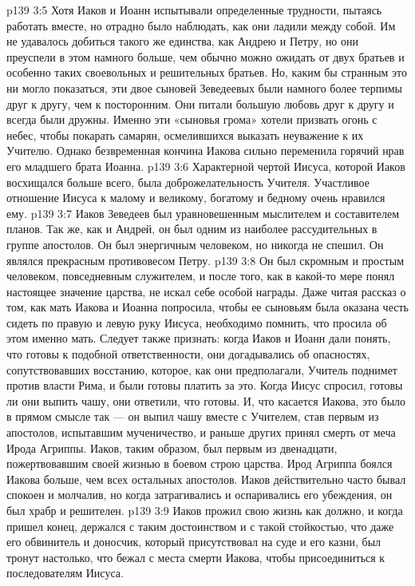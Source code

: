 \vs p139 3:5 Хотя Иаков и Иоанн испытывали определенные трудности, пытаясь работать вместе, но отрадно было наблюдать, как они ладили между собой. Им не удавалось добиться такого же единства, как Андрею и Петру, но они преуспели в этом намного больше, чем обычно можно ожидать от двух братьев и особенно таких своевольных и решительных братьев. Но, каким бы странным это ни могло показаться, эти двое сыновей Зеведеевых были намного более терпимы друг к другу, чем к посторонним. Они питали большую любовь друг к другу и всегда были дружны. Именно эти «сыновья грома» хотели призвать огонь с небес, чтобы покарать самарян, осмелившихся выказать неуважение к их Учителю. Однако безвременная кончина Иакова сильно переменила горячий нрав его младшего брата Иоанна.
\vs p139 3:6 \pc Характерной чертой Иисуса, которой Иаков восхищался больше всего, была доброжелательность Учителя. Участливое отношение Иисуса к малому и великому, богатому и бедному очень нравился ему.
\vs p139 3:7 \pc Иаков Зеведеев был уравновешенным мыслителем и составителем планов. Так же, как и Андрей, он был одним из наиболее рассудительных в группе апостолов. Он был энергичным человеком, но никогда не спешил. Он являлся прекрасным противовесом Петру.
\vs p139 3:8 Он был скромным и простым человеком, повседневным служителем, и после того, как в какой\hyp{}то мере понял настоящее значение царства, не искал себе особой награды. Даже читая рассказ о том, как мать Иакова и Иоанна попросила, чтобы ее сыновьям была оказана честь сидеть по правую и левую руку Иисуса, необходимо помнить, что просила об этом именно мать. Следует также признать: когда Иаков и Иоанн дали понять, что готовы к подобной ответственности, они догадывались об опасностях, сопутствовавших восстанию, которое, как они предполагали, Учитель поднимет против власти Рима, и были готовы платить за это. Когда Иисус спросил, готовы ли они выпить чашу, они ответили, что готовы. И, что касается Иакова, это было в прямом смысле так --- он выпил чашу вместе с Учителем, став первым из апостолов, испытавшим мученичество, и раньше других принял смерть от меча Ирода Агриппы. Иаков, таким образом, был первым из двенадцати, пожертвовавшим своей жизнью в боевом строю царства. Ирод Агриппа боялся Иакова больше, чем всех остальных апостолов. Иаков действительно часто бывал спокоен и молчалив, но когда затрагивались и оспаривались его убеждения, он был храбр и решителен.
\vs p139 3:9 \pc Иаков прожил свою жизнь как должно, и когда пришел конец, держался с таким достоинством и с такой стойкостью, что даже его обвинитель и доносчик, который присутствовал на суде и его казни, был тронут настолько, что бежал с места смерти Иакова, чтобы присоединиться к последователям Иисуса.

